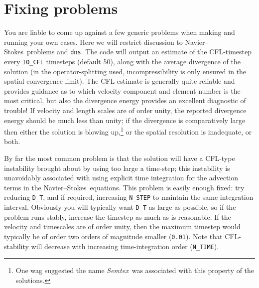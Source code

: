 \documentclass[11pt]{report}
\newcommand{\Semtex}{\emph{Semtex}} \newcommand{\Dog}{\emph{Dog}}
\newcommand\NavSto{Navier--Stokes}
\begin{document}
\section{Fixing problems}
\label{sec.fix}

You are liable to come up against a few generic problems when making
and running your own cases. Here we will restrict discussion to
\NavSto\ problems and \verb+dns+.  The code will output an estimate of
the CFL-timestep every \verb+IO_CFL+ timesteps (default 50), along
with the average divergence of the solution (in the operator-splitting
used, incompressibility is only ensured in the spatial-convergence
limit).
%
The CFL estimate is generally quite reliable and provides guidance as
to which velocity component and element number is the most critical,
but also the divergence energy provides an excellent diagnostic of
trouble!
%
If velocity and length scales are of order unity, the reported
divergence energy should be much less than unity; if the divergence is
comparatively large then either the solution is blowing
up,\footnote{One wag suggested the name \Semtex\ was associated with
  this property of the solutions.} or the spatial resolution is
inadequate, or both.

By far the most common problem is that the solution will have a
CFL-type instability brought about by using too large a time-step;
this instability is unavoidably associated with using explicit time
integration for the advection terms in the \NavSto\ equations. This
problem is easily enough fixed: try reducing \verb+D_T+, and if
required, increasing \verb+N_STEP+ to maintain the same integration
interval. Obviously you will typically want \verb+D_T+ as large as
possible, so if the problem runs stably, increase the timestep as much
as is reasonable. If the velocity and timescales are of order unity,
then the maximum timestep would typically be of order two orders of
magnitude smaller (\verb+0.01+). Note that CFL-stability will decrease
with increasing time-integration order (\verb+N_TIME+).
\end{document}
